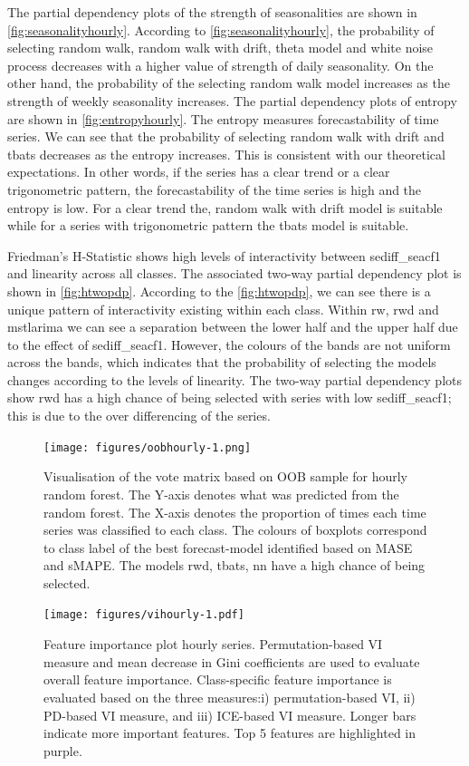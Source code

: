 \documentclass[11pt,a4paper,]{article}
\begin{document}
The partial dependency plots of the strength of seasonalities are shown in \autoref{fig:seasonalityhourly}. According to \autoref{fig:seasonalityhourly}, the probability of selecting random walk, random walk with drift, theta model and white noise process decreases with a higher value of strength of daily seasonality. On the other hand, the probability of the selecting random walk model increases as the strength of weekly seasonality increases. The partial dependency plots of entropy are shown in \autoref{fig:entropyhourly}. The entropy measures forecastability of time series. We can see that the probability of selecting random walk with drift and tbats decreases as the entropy increases. This is consistent with our theoretical expectations. In other words, if the series has a clear trend or a clear trigonometric pattern, the forecastability of the time series is high and the entropy is low. For a clear trend the, random walk with drift model is suitable while for a series with trigonometric pattern the tbats model is suitable.

Friedman's H-Statistic shows high levels of interactivity between sediff\_seacf1 and linearity across all classes. The associated two-way partial dependency plot is shown in \autoref{fig:htwopdp}. According to the \autoref{fig:htwopdp}, we can see there is a unique pattern of interactivity existing within each class. Within rw, rwd and mstlarima we can see a separation between the lower half and the upper half due to the effect of sediff\_seacf1. However, the colours of the bands are not uniform across the bands, which indicates that the probability of selecting the models changes according to the levels of linearity. The two-way partial dependency plots show rwd has a high chance of being selected with series with low sediff\_seacf1; this is due to the over differencing of the series.

\begin{figure}
\centering
\texttt{[image: figures/oobhourly-1.png]}
\caption{\label{fig:oobhourly}Visualisation of the vote matrix based on OOB sample for hourly random forest. The Y-axis denotes what was predicted from the random forest. The X-axis denotes the proportion of times each time series was classified to each class. The colours of boxplots correspond to class label of the best forecast-model identified based on MASE and sMAPE. The models rwd, tbats, nn have a high chance of being selected.}
\end{figure}

\begin{figure}
\centering
\texttt{[image: figures/vihourly-1.pdf]}
\caption{\label{fig:vihourly}Feature importance plot hourly series. Permutation-based VI measure and mean decrease in Gini coefficients are used to evaluate overall feature importance. Class-specific feature importance is evaluated based on the three measures:i) permutation-based VI, ii) PD-based VI measure, and iii) ICE-based VI measure. Longer bars indicate more important features. Top 5 features are highlighted in purple.}
\end{figure}
\end{document}
